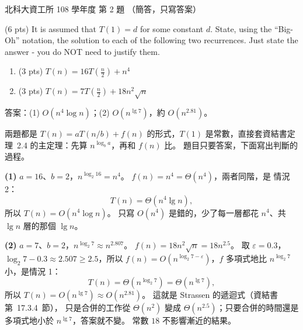 \begin{pastexam}[label={px:ntut-108-ci-04}]{北科大資工所 108 學年度 第 2 題}
（簡答，只寫答案）

(6 pts) It is assumed that $T(1)=d$ for some constant $d$. State, using the ``Big-Oh'' notation, the
solution to each of the following two recurrences. Just state the answer - you do NOT need to
justify them.
\begin{enumerate}[label=(\arabic*)]
\item (3 pts) $T(n)=16T(\frac{n}{2})+n^4$
\item (3 pts) $T(n)=7T(\frac{n}{2})+18n^2\sqrt{n}$
\end{enumerate}
\end{pastexam}

\begin{pastsoln}
答案：(1) $O(n^4 \log n)$；(2) $O(n^{\lg 7})$，約 $O(n^{2.81})$。

兩題都是 $T(n) = aT(n/b) + f(n)$ 的形式，$T(1)$ 是常數，直接套資結書定理~2.4 的主定理：先算
$n^{\log_b a}$，再和 $f(n)$ 比。 題目只要答案，下面寫出判斷的過程。

\textbf{(1)} $a = 16$、$b = 2$，$n^{\log_2 16} = n^4$。 $f(n) = n^4 = \Theta(n^4)$，兩者同階，是
情況 2：
\[
T(n) = \Theta(n^4 \lg n) ,
\]
所以 $T(n) = O(n^4 \log n)$。 只寫 $O(n^4)$ 是錯的，少了每一層都花 $n^4$、共 $\lg n$ 層的那個
$\lg n$。

\textbf{(2)} $a = 7$、$b = 2$，$n^{\log_2 7} \approx n^{2.807}$。 $f(n) = 18 n^2 \sqrt{n} = 18 n^{2.5}$。
取 $\varepsilon = 0.3$，$\log_2 7 - 0.3 \approx 2.507 \ge 2.5$，所以
$f(n) = O(n^{\log_2 7 - \varepsilon})$，$f$ 多項式地比 $n^{\log_2 7}$ 小，是情況 1：
\[
T(n) = \Theta(n^{\log_2 7}) = \Theta(n^{\lg 7}) ,
\]
所以 $T(n) = O(n^{\lg 7}) \approx O(n^{2.81})$。 這就是 Strassen 的遞迴式（資結書第~17.3.4~節），
只是合併的工作從 $\Theta(n^2)$ 變成 $\Theta(n^{2.5})$；只要合併的時間還是多項式地小於
$n^{\lg 7}$，答案就不變。 常數 $18$ 不影響漸近的結果。
\end{pastsoln}
